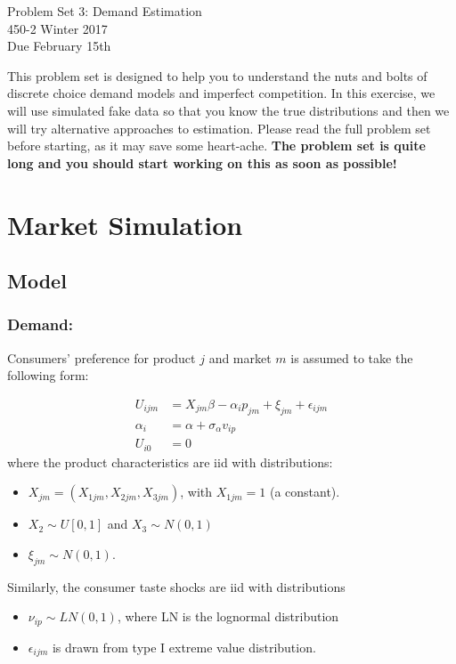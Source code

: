 \documentclass[12pt ]{article}
\begin{document}
\begin{center}
\large
Problem Set 3: Demand Estimation\\
450-2 Winter 2017\\
Due February 15th
 \end{center}


 This problem set is designed to help you to understand the nuts and
 bolts of discrete choice demand models and imperfect competition. In
 this exercise, we will use simulated fake data so that you know the
 true distributions and then we will try alternative approaches to
 estimation. Please read the full problem set before starting, as it
 may save some heart-ache. \textbf{The problem set is quite long and you should start working on this as soon as possible!}

\section{Market Simulation}

\subsection{Model}
\subsubsection{Demand:}
Consumers' preference for product $j$ and market $m$ is assumed to
take the following form:

\begin{align}
U_{ijm} &=X_{jm} \beta - \alpha_i p_{jm} + \xi_{jm} + \epsilon_{ijm} \nonumber\\
\alpha_i &= \alpha+\sigma_{\alpha} v_{ip}\nonumber\\
U_{i0} &= 0
\end{align}
where the product characteristics are iid with distributions:
\begin{itemize}
\item $X_{jm}=(X_{1jm}, X_{2jm}, X_{3jm})$, with $X_{1jm}=1$ (a constant).
\item $X_2\sim U[0,1]$ and $X_3\sim N(0,1)$
\item $\xi_{jm}\sim N(0,1)$.
\end{itemize}

Similarly, the consumer taste shocks are iid with distributions
\begin{itemize}
\item $\nu_{ip}\sim LN(0,1)$, where LN is the lognormal distribution
\item $\epsilon_{ijm}$ is drawn from type I extreme value distribution.
\end{itemize}
\end{document}
